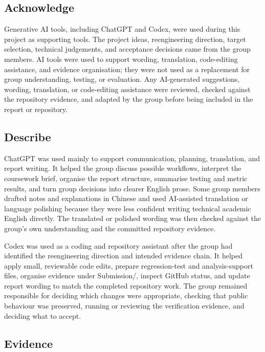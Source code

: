 \documentclass[11pt,a4paper]{article}
\begin{document}
\subsection*{Acknowledge}


Generative AI tools, including ChatGPT and Codex, were used during this project as supporting tools. The project ideas, reengineering direction, target selection, technical judgements, and acceptance decisions came from the group members. AI tools were used to support wording, translation, code-editing assistance, and evidence organisation; they were not used as a replacement for group understanding, testing, or evaluation. Any AI-generated suggestions, wording, translation, or code-editing assistance were reviewed, checked against the repository evidence, and adapted by the group before being included in the report or repository.


\subsection*{Describe}


ChatGPT was used mainly to support communication, planning, translation, and report writing. It helped the group discuss possible workflows, interpret the coursework brief, organise the report structure, summarise testing and metric results, and turn group decisions into clearer English prose. Some group members drafted notes and explanations in Chinese and used AI-assisted translation or language polishing because they were less confident writing technical academic English directly. The translated or polished wording was then checked against the group's own understanding and the committed repository evidence.


Codex was used as a coding and repository assistant after the group had identified the reengineering direction and intended evidence chain. It helped apply small, reviewable code edits, prepare regression-test and analysis-support files, organise evidence under Submission/, inspect GitHub status, and update report wording to match the completed repository work. The group remained responsible for deciding which changes were appropriate, checking that public behaviour was preserved, running or reviewing the verification evidence, and deciding what to accept.


\subsection*{Evidence}
\end{document}
